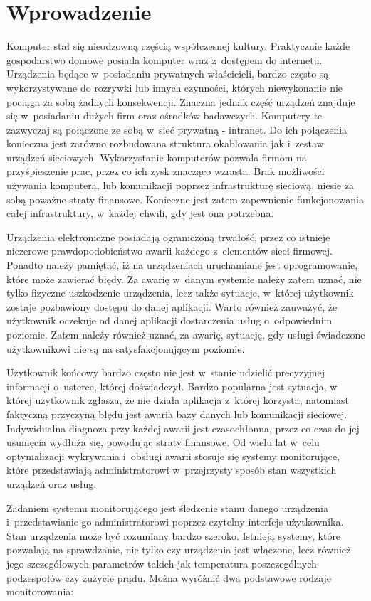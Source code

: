 \chapter{Wprowadzenie}

Komputer stał się nieodzowną częścią współczesnej kultury. Praktycznie
każde gospodarstwo domowe posiada komputer wraz z~dostępem do
internetu. Urządzenia będące w~posiadaniu prywatnych właścicieli,
bardzo często są wykorzystywane do rozrywki lub innych czynności,
których niewykonanie nie pociąga za sobą żadnych konsekwencji. Znaczna
jednak część urządzeń znajduje się w~posiadaniu dużych firm oraz
ośrodków badawczych. Komputery te zazwyczaj są połączone ze sobą
w~sieć prywatną - intranet. Do ich połączenia konieczna jest zarówno
rozbudowana struktura okablowania jak i~zestaw urządzeń
sieciowych. Wykorzystanie komputerów pozwala firmom na przyśpieszenie
prac, przez co ich zysk znacząco wzrasta. Brak możliwości używania
komputera, lub komunikacji poprzez infrastrukturę sieciową, niesie za
sobą poważne straty finansowe. Konieczne jest zatem zapewnienie
funkcjonowania całej infrastruktury, w~każdej chwili, gdy jest ona
potrzebna.

Urządzenia elektroniczne posiadają ograniczoną trwałość, przez co
istnieje niezerowe prawdopodobieństwo awarii każdego z~elementów sieci
firmowej. Ponadto należy pamiętać, iż na urządzeniach uruchamiane jest
oprogramowanie, które może zawierać błędy. Za awarię w~danym systemie
należy zatem uznać, nie tylko fizyczne uszkodzenie urządzenia, lecz
także sytuacje, w~której użytkownik zostaje pozbawiony dostępu do
danej aplikacji. Warto również zauważyć, że użytkownik oczekuje od
danej aplikacji dostarczenia usług o~odpowiednim poziomie. Zatem
należy również uznać, za awarię, sytuację, gdy usługi świadczone
użytkownikowi nie są na satysfakcjonującym poziomie.

Użytkownik końcowy bardzo często nie jest w~stanie udzielić
precyzyjnej informacji o~usterce, której doświadczył. Bardzo popularna
jest sytuacja, w której użytkownik zgłasza, że nie działa aplikacja
z~której korzysta, natomiast faktyczną przyczyną błędu jest awaria
bazy danych lub komunikacji sieciowej. Indywidualna diagnoza przy
każdej awarii jest czasochłonna, przez co czas do jej usunięcia
wydłuża się, powodując straty finansowe. Od wielu lat w~celu
optymalizacji wykrywania i~obsługi awarii stosuje się systemy
monitorujące, które przedstawiają administratorowi w~przejrzysty
sposób stan wszystkich urządzeń oraz usług.

Zadaniem systemu monitorującego jest śledzenie stanu danego urządzenia
i~przedstawianie go administratorowi poprzez czytelny interfejs
użytkownika. Stan urządzenia może być rozumiany bardzo
szeroko. Istnieją systemy, które pozwalają na sprawdzanie, nie tylko
czy urządzenia jest włączone, lecz również jego szczegółowych
parametrów takich jak temperatura poszczególnych podzespołów czy
zużycie prądu. Można wyróżnić dwa podstawowe rodzaje monitorowania:

